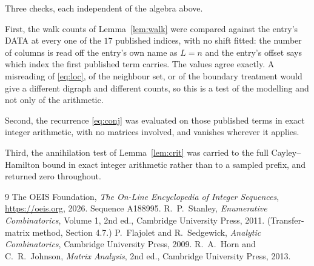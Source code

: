 \documentclass[11pt,a4paper]{article}
\theoremstyle{plain}
\theoremstyle{definition}
\begin{document}
Three checks, each independent of the algebra above.

First, the walk counts of Lemma~\ref{lem:walk} were compared against the entry's DATA at
every one of the $17$ published indices, with no shift fitted: the number of columns is
read off the entry's own name as $L=n$ and the entry's offset says which index the first
published term carries. The values agree exactly. A misreading of \eqref{eq:loc}, of the
neighbour set, or of the boundary treatment would give a different digraph and different
counts, so this is a test of the modelling and not only of the arithmetic.

Second, the recurrence \eqref{eq:conj} was evaluated on those published terms in exact
integer arithmetic, with no matrices involved, and vanishes wherever it applies.

Third, the annihilation test of Lemma~\ref{lem:crit} was carried to the full
Cayley--Hamilton bound in exact integer arithmetic rather than to a sampled prefix, and
returned zero throughout.

\begin{thebibliography}{9}
 The OEIS Foundation, \emph{The On-Line Encyclopedia of Integer
Sequences}, \url{https://oeis.org}, 2026. Sequence A188995.
 R.~P.~Stanley, \emph{Enumerative Combinatorics}, Volume 1, 2nd ed.,
Cambridge University Press, 2011. (Transfer-matrix method, Section 4.7.)
 P.~Flajolet and R.~Sedgewick, \emph{Analytic Combinatorics}, Cambridge
University Press, 2009.
 R.~A.~Horn and C.~R.~Johnson, \emph{Matrix Analysis}, 2nd ed., Cambridge
University Press, 2013.
\end{thebibliography}
\end{document}
